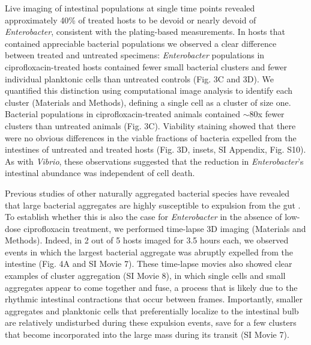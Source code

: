 Live imaging of intestinal populations at single time points revealed approximately 40\% of treated hosts to be devoid or nearly devoid of \textit{Enterobacter}, consistent with the plating-based measurements. In hosts that contained appreciable bacterial populations we observed a clear difference between treated and untreated specimens: \textit{Enterobacter}  populations in ciprofloxacin-treated hosts contained fewer small bacterial clusters and fewer individual planktonic cells than untreated controls (Fig. 3C and 3D). We quantified this distinction using computational image analysis to identify each cluster (Materials and Methods), defining a single cell as a cluster of size one. Bacterial populations in ciprofloxacin-treated animals contained $\sim$80x fewer clusters than untreated animals (Fig. 3C). Viability staining showed that there were no obvious differences in the viable fractions of bacteria expelled from the intestines of untreated and treated hosts (Fig. 3D, insets, SI Appendix, Fig. S10). As with \textit{Vibrio}, these observations suggested that the reduction in \textit{Enterobacter}'s intestinal abundance was independent of cell death.  


Previous studies of other naturally aggregated bacterial species have revealed that large bacterial aggregates are highly susceptible to expulsion from the gut \cite{Wiles2016,Logan2018}. To establish whether this is also the case for \textit{Enterobacter} in the absence of low-dose ciprofloxacin treatment, we performed time-lapse 3D imaging (Materials and Methods). Indeed, in 2 out of 5 hosts imaged for 3.5 hours each, we observed events in which the largest bacterial aggregate was abruptly expelled from the intestine (Fig. 4A and SI Movie 7). These time-lapse movies also showed clear examples of cluster aggregation (SI Movie 8), in which single cells and small aggregates appear to come together and fuse, a process that is likely due to the rhythmic intestinal contractions that occur between frames. Importantly, smaller aggregates and planktonic cells that preferentially localize to the intestinal bulb are relatively undisturbed during these expulsion events, save for a few clusters that become incorporated into the large mass during its transit (SI Movie 7). 

